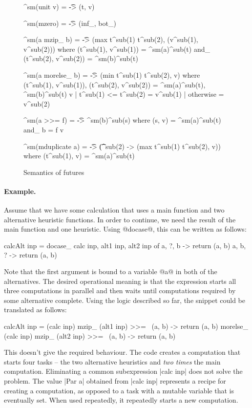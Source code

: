 \documentclass[preprint]{sigplanconf}
\begin{document}
\begin{figure}
\begin{code}
^sm(unit v)    = \t -> (t, v)

^sm(mzero)      = \t -> (inf_, bot_)

^sm(a mzip_ b)  = \t -> (max t^sub(1) t^sub(2), (v^sub(1), v^sub(2)))
	where  (t^sub(1), v^sub(1)) = ^sm(a)^sub(t) and_ (t^sub(2), v^sub(2)) = ^sm(b)^sub(t)

^sm(a morelse_ b)  = \t -> (min t^sub(1) t^sub(2), v)
	where  (t^sub(1), v^sub(1)), (t^sub(2), v^sub(2)) = ^sm(a)^sub(t), ^sm(b)^sub(t)
	       v | t^sub(1) <= t^sub(2) = v^sub(1) | otherwise = v^sub(2)

^sm(a >>= f)  = \t -> ^sm(b)^sub(s)
	where  (s, v) = ^sm(a)^sub(t) and_ b = f v

^sm(mduplicate a)  = \t -> (\t^sub(2) -> (max t^sub(1) t^sub(2), v))
	where (t^sub(1), v) = ^sm(a)^sub(t)
\end{code}
\label{fig:future-semantics}
\caption{Semantics of futures}
\end{figure}

\paragraph{Example.} Assume that we have some calculation that uses a main function and two alternative
heuristic functions. In order to continue, we need the result of the main function and one heuristic.
Using @docase@, this can be written as follows:

\begin{code}
calcAlt inp = docase_ calc inp, alt1 inp, alt2 inp of
  a, ?, b -> return (a, b)
  a, b, ? -> return (a, b)
\end{code}
Note that the first argument is bound to a variable @a@ in both of the alternatives. The desired 
operational meaning is that the expression starts all three computations in parallel and then waits 
until computations required by some alternative complete. Using the logic described so far, the 
snippet could be translated as follows:

\begin{code}
calcAlt inp = 
  (calc inp) mzip_ (alt1 inp) >>= \ (a, b) -> return (a, b) morelse_
  (calc inp) mzip_ (alt2 inp) >>= \ (a, b) -> return (a, b)
\end{code}
This doesn't give the required behaviour. The code creates a computation that 
starts four tasks -- the two alternative heuristics and \textit{two times} the main
computation. Eliminating a common subexpression |calc inp| does not solve the problem. The value 
|Par a| obtained from |calc inp| represents a recipe for creating a computation, as opposed to 
a task with a mutable variable that is eventually set. When used repeatedly, it repeatedly 
starts a new computation.
\end{document}

